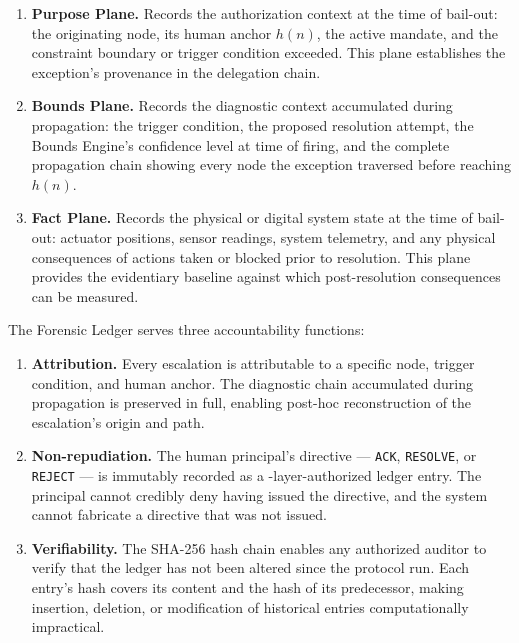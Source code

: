 \begin{enumerate}\itemsep=0pt
\item \textbf{Purpose Plane.} Records the authorization context at the time of bail-out: the originating node, its human anchor $h(n)$, the active mandate, and the constraint boundary or trigger condition exceeded. This plane establishes the exception's provenance in the delegation chain.

\item \textbf{Bounds Plane.} Records the diagnostic context accumulated during propagation: the trigger condition, the proposed resolution attempt, the Bounds Engine's confidence level at time of firing, and the complete propagation chain showing every node the exception traversed before reaching $h(n)$.

\item \textbf{Fact Plane.} Records the physical or digital system state at the time of bail-out: actuator positions, sensor readings, system telemetry, and any physical consequences of actions taken or blocked prior to resolution. This plane provides the evidentiary baseline against which post-resolution consequences can be measured.
\end{enumerate}

The Forensic Ledger serves three accountability functions:

\begin{enumerate}\itemsep=0pt
\item \textbf{Attribution.} Every escalation is attributable to a specific node, trigger condition, and human anchor. The diagnostic chain accumulated during propagation is preserved in full, enabling post-hoc reconstruction of the escalation's origin and path.

\item \textbf{Non-repudiation.} The human principal's directive — \texttt{ACK}, \texttt{RESOLVE}, or \texttt{REJECT} — is immutably recorded as a \purpose-layer-authorized ledger entry. The principal cannot credibly deny having issued the directive, and the system cannot fabricate a directive that was not issued.

\item \textbf{Verifiability.} The SHA-256 hash chain enables any authorized auditor to verify that the ledger has not been altered since the protocol run. Each entry's hash covers its content and the hash of its predecessor, making insertion, deletion, or modification of historical entries computationally impractical.
\end{enumerate}

